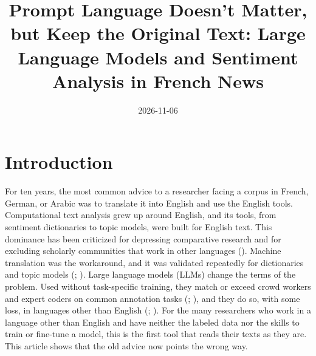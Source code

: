 \documentclass[
  man,
  floatsintext,
  longtable,
  nolmodern,
  notxfonts,
  notimes,
  colorlinks=true,linkcolor=blue,citecolor=blue,urlcolor=blue]{apa7}
\title{Prompt Language Doesn't Matter, but Keep the Original Text: Large
Language Models and Sentiment Analysis in French News}
\affiliation{
{Département de science politique, Université Laval}}
\date{2026-11-06}
\newlength{\cslhangindent}
\newlength{\csllabelwidth}
\begin{document}
\maketitle




\setlength\LTleft{0pt}



\ifdefined\Shaded\renewenvironment{Shaded}{\begin{snugshade}\begin{singlespace}}{\end{singlespace}\end{snugshade}}\fi


\ifdefined\cslhangindent\else\newlength{\cslhangindent}\fi
\ifdefined\csllabelwidth\else\newlength{\csllabelwidth}\fi
\setlength{\cslhangindent}{0.5in}


\section{Introduction}\label{introduction}

For ten years, the most common advice to a researcher facing a corpus in
French, German, or Arabic was to translate it into English and use the
English tools. Computational text analysis grew up around English, and
its tools, from sentiment dictionaries to topic models, were built for
English text. This dominance has been criticized for depressing
comparative research and for excluding scholarly communities that work
in other languages (). Machine translation was the workaround, and it was
validated repeatedly for dictionaries and topic models
(;
). Large language models (LLMs) change the terms of the problem.
Used without task-specific training, they match or exceed crowd workers
and expert coders on common annotation tasks
(; ),
and they do so, with some loss, in languages other than English
(; ). For the many researchers who work in a language other than
English and have neither the labeled data nor the skills to train or
fine-tune a model, this is the first tool that reads their texts as they
are. This article shows that the old advice now points the wrong way.
\end{document}
